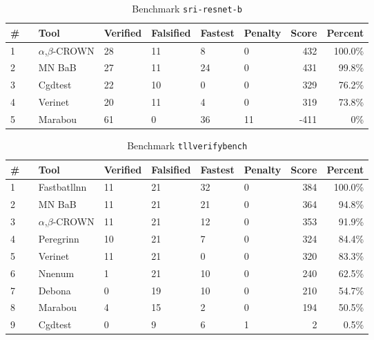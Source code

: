 
\begin{table}[h]
\begin{center}
\caption{Benchmark \texttt{sri-resnet-b}} \label{tab:cat_{cat}}
{\setlength{\tabcolsep}{2pt}
\begin{tabular}[h]{@{}llllllrr@{}}
\toprule
\textbf{\# ~} & \textbf{Tool} & \textbf{Verified} & \textbf{Falsified} & \textbf{Fastest} & \textbf{Penalty} & \textbf{Score} & \textbf{Percent}\\
\midrule
1 & $\alpha$,$\beta$-CROWN & 28 & 11 & 8 & 0 & 432 & 100.0\% \\
2 & MN BaB & 27 & 11 & 24 & 0 & 431 & 99.8\% \\
3 & Cgdtest & 22 & 10 & 0 & 0 & 329 & 76.2\% \\
4 & Verinet & 20 & 11 & 4 & 0 & 319 & 73.8\% \\
5 & Marabou & 61 & 0 & 36 & 11 & -411 & 0\% \\
\bottomrule
\end{tabular}
}
\end{center}
\end{table}




\begin{table}[h]
\begin{center}
\caption{Benchmark \texttt{tllverifybench}} \label{tab:cat_{cat}}
{\setlength{\tabcolsep}{2pt}
\begin{tabular}[h]{@{}llllllrr@{}}
\toprule
\textbf{\# ~} & \textbf{Tool} & \textbf{Verified} & \textbf{Falsified} & \textbf{Fastest} & \textbf{Penalty} & \textbf{Score} & \textbf{Percent}\\
\midrule
1 & Fastbatllnn & 11 & 21 & 32 & 0 & 384 & 100.0\% \\
2 & MN BaB & 11 & 21 & 21 & 0 & 364 & 94.8\% \\
3 & $\alpha$,$\beta$-CROWN & 11 & 21 & 12 & 0 & 353 & 91.9\% \\
4 & Peregrinn & 10 & 21 & 7 & 0 & 324 & 84.4\% \\
5 & Verinet & 11 & 21 & 0 & 0 & 320 & 83.3\% \\
6 & Nnenum & 1 & 21 & 10 & 0 & 240 & 62.5\% \\
7 & Debona & 0 & 19 & 10 & 0 & 210 & 54.7\% \\
8 & Marabou & 4 & 15 & 2 & 0 & 194 & 50.5\% \\
9 & Cgdtest & 0 & 9 & 6 & 1 & 2 & 0.5\% \\
\bottomrule
\end{tabular}
}
\end{center}
\end{table}



